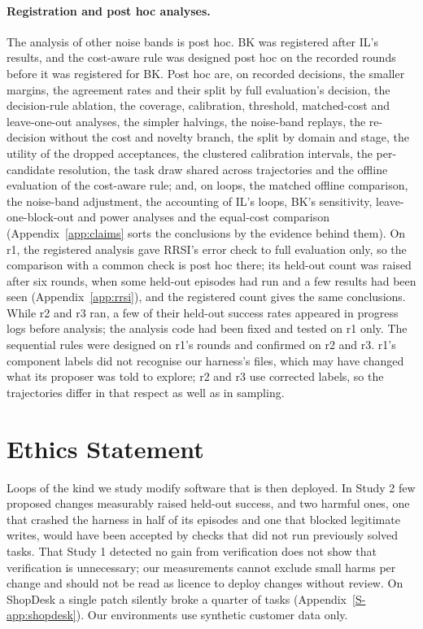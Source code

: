 \documentclass[11pt]{article}
\begin{document}
\paragraph{Registration and post hoc analyses.} The analysis of other noise bands is post hoc. BK was registered after IL's results, and the cost-aware rule was designed post hoc on the recorded rounds before it was registered for BK. Post hoc are, on recorded decisions, the smaller margins, the agreement rates and their split by full evaluation's decision, the decision-rule ablation, the coverage, calibration, threshold, matched-cost and leave-one-out analyses, the simpler halvings, the noise-band replays, the re-decision without the cost and novelty branch, the split by domain and stage, the utility of the dropped acceptances, the clustered calibration intervals, the per-candidate resolution, the task draw shared across trajectories and the offline evaluation of the cost-aware rule; and, on loops, the matched offline comparison, the noise-band adjustment, the accounting of IL's loops, BK's sensitivity, leave-one-block-out and power analyses and the equal-cost comparison (Appendix~\ref{app:claims} sorts the conclusions by the evidence behind them). On r1, the registered analysis gave RRSI's error check to full evaluation only, so the comparison with a common check is post hoc there; its held-out count was raised after six rounds, when some held-out episodes had run and a few results had been seen (Appendix~\ref{app:rrsi}), and the registered count gives the same conclusions. While r2 and r3 ran, a few of their held-out success rates appeared in progress logs before analysis; the analysis code had been fixed and tested on r1 only. The sequential rules were designed on r1's rounds and confirmed on r2 and r3. r1's component labels did not recognise our harness's files, which may have changed what its proposer was told to explore; r2 and r3 use corrected labels, so the trajectories differ in that respect as well as in sampling.

\section*{Ethics Statement}
Loops of the kind we study modify software that is then deployed. In Study 2 few proposed changes measurably raised held-out success, and two harmful ones, one that crashed the harness in half of its episodes and one that blocked legitimate writes, would have been accepted by checks that did not run previously solved tasks. That Study 1 detected no gain from verification does not show that verification is unnecessary; our measurements cannot exclude small harms per change and should not be read as licence to deploy changes without review. On ShopDesk a single patch silently broke a quarter of tasks (Appendix~\ref*{S-app:shopdesk}). Our environments use synthetic customer data only.
\end{document}
